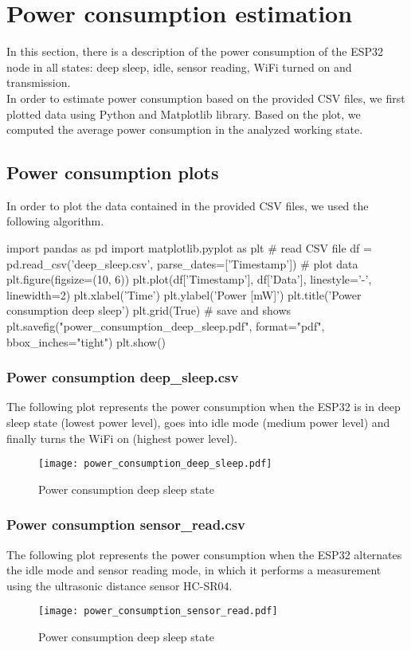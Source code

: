 \section{Power consumption estimation}
In this section, there is a description of the power consumption of the ESP32 node in all states: deep sleep, idle, sensor reading, WiFi turned on and transmission.\\
In order to estimate power consumption based on the provided CSV files, we first plotted data using Python and Matplotlib library. Based on the plot, we computed the average power consumption in the analyzed working state.

\subsection{Power consumption plots}
In order to plot the data contained in the provided CSV files, we used the following algorithm.

\begin{python}
import pandas as pd
import matplotlib.pyplot as plt
# read CSV file 
df = pd.read_csv('deep_sleep.csv', parse_dates=['Timestamp'])
# plot data
plt.figure(figsize=(10, 6))
plt.plot(df['Timestamp'], df['Data'], linestyle='-', linewidth=2)
plt.xlabel('Time')
plt.ylabel('Power [mW]')
plt.title('Power consumption deep sleep')
plt.grid(True)
# save and shows
plt.savefig("power_consumption_deep_sleep.pdf", format="pdf", bbox_inches="tight")
plt.show()
\end{python}

\subsubsection{Power consumption deep\_sleep.csv}
The following plot represents the power consumption when the ESP32 is in deep sleep state (lowest power level), goes into idle mode (medium power level) and finally turns the WiFi on (highest power level). 
\begin{figure}[H]
    \centering
    \texttt{[image: power\_consumption\_deep\_sleep.pdf]}
    \caption{Power consumption deep sleep state}
    \label{fig:Power consumption deep sleep state}
\end{figure}

\subsubsection{Power consumption sensor\_read.csv}
The following plot represents the power consumption when the ESP32 alternates the idle mode and sensor reading mode, in which it performs a measurement using the ultrasonic distance sensor HC-SR04.
\begin{figure}[H]
    \centering
    \texttt{[image: power\_consumption\_sensor\_read.pdf]}
    \caption{Power consumption deep sleep state}
    \label{fig:Power consumption deep sleep state}
\end{figure}

